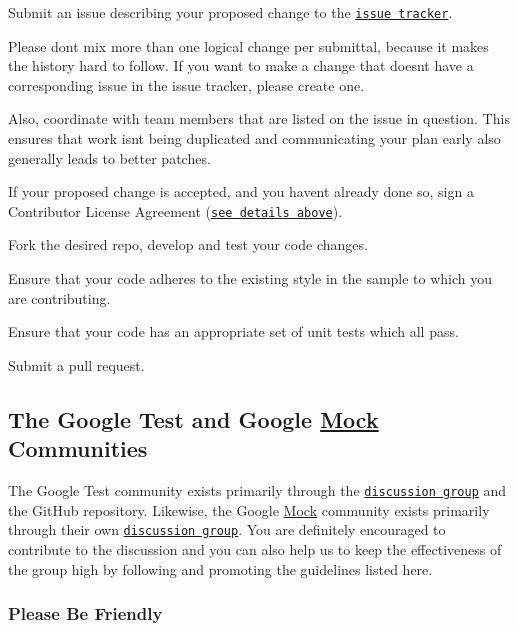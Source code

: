 \begin{DoxyEnumerate}
\item Submit an issue describing your proposed change to the \href{https://github.com/google/googletest/issues}{\tt issue tracker}.
\item Please don\textquotesingle{}t mix more than one logical change per submittal, because it makes the history hard to follow. If you want to make a change that doesn\textquotesingle{}t have a corresponding issue in the issue tracker, please create one.
\item Also, coordinate with team members that are listed on the issue in question. This ensures that work isn\textquotesingle{}t being duplicated and communicating your plan early also generally leads to better patches.
\item If your proposed change is accepted, and you haven\textquotesingle{}t already done so, sign a Contributor License Agreement (\href{#contributor-license-agreements}{\tt see details above}).
\item Fork the desired repo, develop and test your code changes.
\item Ensure that your code adheres to the existing style in the sample to which you are contributing.
\item Ensure that your code has an appropriate set of unit tests which all pass.
\item Submit a pull request.
\end{DoxyEnumerate}

\subsection*{The Google Test and Google \mbox{\hyperlink{classMock}{Mock}} Communities}

The Google Test community exists primarily through the \href{https://groups.google.com/group/googletestframework}{\tt discussion group} and the Git\+Hub repository. Likewise, the Google \mbox{\hyperlink{classMock}{Mock}} community exists primarily through their own \href{https://groups.google.com/group/googlemock}{\tt discussion group}. You are definitely encouraged to contribute to the discussion and you can also help us to keep the effectiveness of the group high by following and promoting the guidelines listed here.

\subsubsection*{Please Be Friendly}

